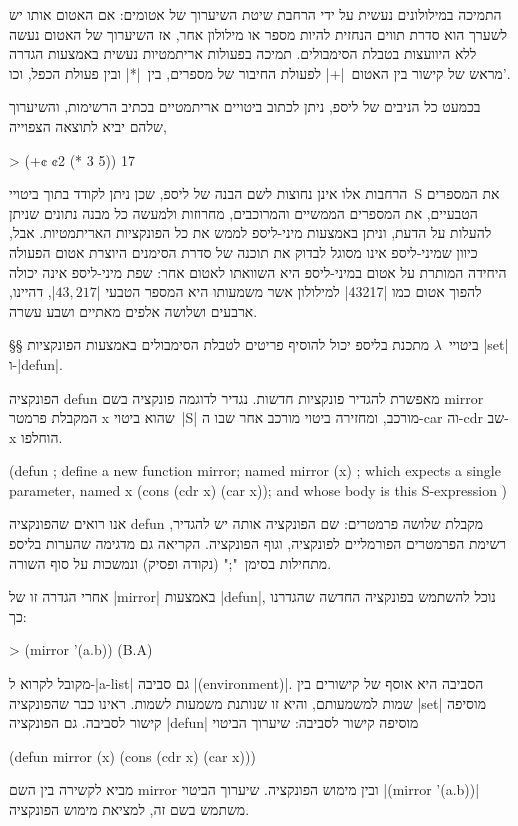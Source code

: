 התמיכה במילולונים נעשית על ידי הרחבת שיטת השיערוך של אטומים: אם האטום אותו יש
לשערך הוא סדרת תווים הנחזית להיות מספר או מילולון אחר, אז השיערוך של האטום נעשה
ללא היוועצות בטבלת הסימבולים. תמיכה בפעולות אריתמטיות נעשית באמצעות הגדרה מראש
של קישור בין האטום~\T|+| לפעולת החיבור של מספרים, בין~\T|*| ובין פעולת הכפל,
וכו'.

בכמעט כל הניבים של ליספ, ניתן לכתוב ביטויים אריתמטיים בכתיב הרשימות, והשיערוך
שלהם יביא לתוצאה הצפוייה,

\begin{LISP}
> (+¢ ¢2 (* 3 5))
17
\end{LISP}

הרחבות אלו אינן נחוצות לשם הבנה של ליספ, שכן ניתן לקודד בתוך ביטויי~S את
המספרים הטבעיים, את המספרים הממשיים והמרוכבים, מחרוזות ולמעשה כל מבנה נתונים
שניתן להעלות על הדעת, וניתן באמצעות מיני-ליספ לממש את כל הפונקציות האריתמטיות.
אבל, כיוון שמיני-ליספ אינו מסוגל לבדוק את תוכנה של סדרת הסימנים היוצרת אטום
הפעולה היחידה המותרת על אטום במיני-ליספ היא השוואתו לאטום אחר: שפת מיני-ליספ
אינה יכולה להפוך אטום כמו \T|43217| למילולון אשר משמעותו היא המספר הטבעי
\E|$43,217$|, דהיינו, ארבעים ושלושה אלפים מאתיים ושבע עשרה.

§§ ביטויי~$λ$
מתכנת בליספ יכול להוסיף פריטים לטבלת הסימבולים באמצעות הפונקציות \E|set|
ו-\E|defun|.

הפונקציה defun מאפשרת להגדיר פונקציות חדשות. נגדיר לדוגמה פונקציה בשם mirror
המקבלת פרמטר x שהוא ביטוי~\E|S| מורכב, ומחזירה ביטוי מורכב אחר שבו ה-car וה-cdr
שב-x הוחלפו.
\begin{LISP}
(defun ; define a new function
  mirror; named mirror
  (x) ; which expects a single parameter, named x
  (cons (cdr x) (car x)); and whose body is this S-expression
)
\end{LISP}
אנו רואים שהפונקציה defun מקבלת שלושה פרמטרים: שם הפונקציה אותה יש להגדיר,
רשימת הפרמטרים הפורמליים לפונקציה, וגוף הפונקציה. הקריאה גם מדגימה שהערות בליספ
מתחילות בסימן~";" (נקודה ופסיק) ונמשכות על סוף השורה.

אחרי הגדרה זו של \E|mirror| באמצעות \E|defun|, נוכל להשתמש בפונקציה החדשה
שהגדרנו כך:
\begin{LISP}
> (mirror '(a.b))
(B.A)
\end{LISP}

מקובל לקרוא ל-\E|a-list| גם סביבה \E|(environment)|. הסביבה היא אוסף של קישורים
בין שמות למשמעותם, והיא זו שנותנת משמעות לשמות. ראינו כבר שהפונקציה \E|set|
מוסיפה קישור לסביבה. גם הפונקציה \E|defun| מוסיפה קישור לסביבה: שיערוך הביטוי
\begin{LISP}
(defun mirror (x) (cons (cdr x) (car x)))
\end{LISP}
מביא לקשירה בין השם mirror ובין מימוש הפונקציה. שיערוך הביטוי \T|(mirror
'(a.b))| משתמש בשם זה, למציאת מימוש הפונקציה.

